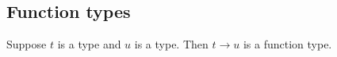 \documentclass[12pt]{article}
\begin{document}
\subsection{Function types}

Suppose $t$ is a type and $u$ is a type. Then $t\rightarrow u$ is a function
type.

\begin{figure}[tb]%

\begin{center}
%
%
%
%
%
%
%
%
%
%
\end{center}
\end{figure}
\end{document}
